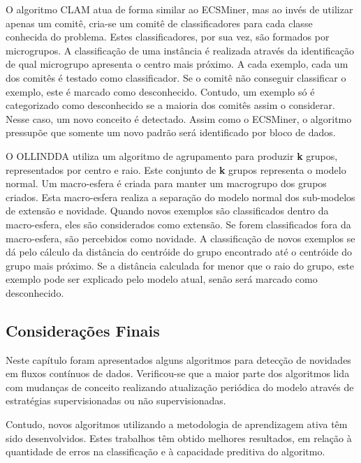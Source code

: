 \documentclass[qual, classic, a4paper]{ufbathesis}
\begin{document}
O algoritmo CLAM \cite{malkhateeb} atua de forma similar ao ECSMiner, mas ao invés de utilizar apenas um comitê, cria-se um comitê de classificadores para cada classe conhecida do problema.
Estes classificadores, por sua vez, são formados por microgrupos. A classificação de uma instância é realizada através da identificação de qual microgrupo apresenta o centro mais próximo. A cada exemplo, cada um dos comitês é testado como classificador. Se o comitê não conseguir classificar o exemplo, este é marcado como desconhecido. Contudo, um exemplo só é categorizado como desconhecido se a maioria dos comitês assim o considerar. Nesse caso, um novo conceito é detectado. Assim como o ECSMiner, o algoritmo pressupõe que somente um novo padrão será identificado por bloco de dados.

O OLLINDDA \cite{Spinosa:2009:NDA:1551768.1551770} utiliza um algoritmo de agrupamento para produzir \textbf{k} grupos, representados por centro e raio. Este conjunto de \textbf{k} grupos representa o modelo normal. 
Um macro-esfera é criada para manter um macrogrupo dos grupos criados. Esta macro-esfera realiza a separação do modelo normal dos sub-modelos de extensão e novidade. 
Quando novos exemplos são classificados dentro da macro-esfera, eles são considerados como extensão. Se forem classificados fora da macro-esfera, são percebidos como novidade. 
A classificação de novos exemplos se dá pelo cálculo da distância do centróide do grupo encontrado até o centróide do grupo mais próximo.
Se a distância calculada for menor que o raio do grupo, este exemplo pode ser explicado pelo modelo atual, senão será marcado como desconhecido.

\subsection{Considerações Finais}

Neste capítulo foram apresentados alguns algoritmos para detecção de novidades em fluxos contínuos de dados. Verificou-se que a maior parte dos algoritmos lida com mudanças de conceito realizando atualização periódica do modelo através de estratégias supervisionadas ou não supervisionadas.

Contudo, novos algoritmos utilizando a metodologia de aprendizagem ativa têm sido desenvolvidos. Estes trabalhos têm obtido melhores resultados, em relação à quantidade de erros na classificação e à capacidade preditiva do algoritmo.

\end{document}
